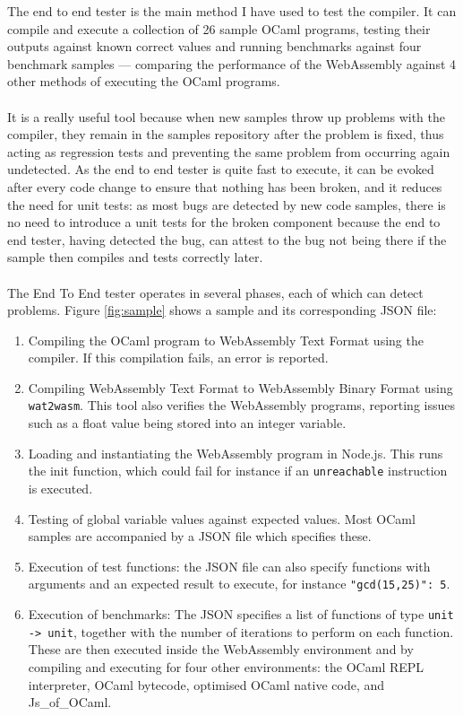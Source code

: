\documentclass[12pt,twoside,notitlepage]{report}
\newcommand{\textinline}{\texttt}
\newcommand{\camlinline}{\texttt}
\newcommand{\wainline}{\texttt}
\begin{document}
The end to end tester is the main method I have used to test the compiler. It can compile and execute a collection of 26 sample OCaml programs, testing their outputs against known correct values and running benchmarks against four benchmark samples --- comparing the performance of the WebAssembly against 4 other methods of executing the OCaml programs.
\\\\
It is a really useful tool because when new samples throw up problems with the compiler, they remain in the samples repository after the problem is fixed, thus acting as regression tests and preventing the same problem from occurring again undetected. As the end to end tester is quite fast to execute, it can be evoked after every code change to ensure that nothing has been broken, and it reduces the need for unit tests: as most bugs are detected by new code samples, there is no need to introduce a unit tests for the broken component because the end to end tester, having detected the bug, can attest to the bug not being there if the sample then compiles and tests correctly later.
\\\\
The End To End tester operates in several phases, each of which can detect problems. Figure \ref{fig:sample} shows a sample and its corresponding JSON file:
\begin{enumerate}
	\item Compiling the OCaml program to WebAssembly Text Format using the compiler. If this compilation fails, an error is reported.
	\item Compiling WebAssembly Text Format to WebAssembly Binary Format using \textinline{wat2wasm}. This tool also verifies the WebAssembly programs, reporting issues such as a float value being stored into an integer variable.
	\item Loading and instantiating the WebAssembly program in Node.js. This runs the init function, which could fail for instance if an \wainline{unreachable} instruction is executed.
	\item Testing of global variable values against expected values. Most OCaml samples are accompanied by a JSON file which specifies these.
	\item Execution of test functions: the JSON file can also specify functions with arguments and an expected result to execute, for instance \textinline{"gcd(15,25)": 5}.
	\item Execution of benchmarks: The JSON specifies a list of functions of type \camlinline{unit -> unit}, together with the number of iterations to perform on each function. These are then executed inside the WebAssembly environment and by compiling and executing for four other environments: the OCaml REPL interpreter, OCaml bytecode, optimised OCaml native code, and Js\_of\_OCaml.
\end{enumerate}
\end{document}

